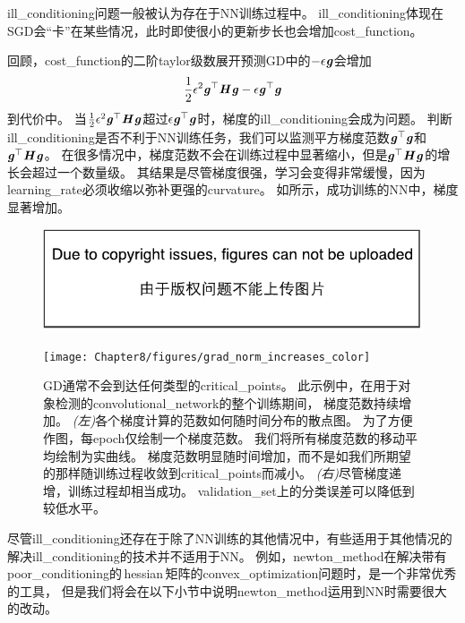 \gls{ill_conditioning}问题一般被认为存在于\gls{NN}训练过程中。
\gls{ill_conditioning}体现在\gls{SGD}会``卡''在某些情况，此时即使很小的更新步长也会增加\gls{cost_function}。

回顾，\gls{cost_function}的二阶\gls{taylor}级数展开预测\gls{GD}中的$-\epsilon\boldsymbol{\mathit{g}}$会增加
\begin{equation}
    \frac{1}{2} \epsilon^2 \boldsymbol{\mathit{g}}^\top \boldsymbol{\mathit{H}}\boldsymbol{\mathit{g}} - \epsilon\boldsymbol{\mathit{g}}^\top\boldsymbol{\mathit{g}}
\end{equation}
到代价中。
当$\frac{1}{2} \epsilon^2 \boldsymbol{\mathit{g}}^\top\boldsymbol{\mathit{H}}\boldsymbol{\mathit{g}}$超过$\epsilon\boldsymbol{\mathit{g}}^\top\boldsymbol{\mathit{g}}$时，梯度的\gls{ill_conditioning}会成为问题。
判断\gls{ill_conditioning}是否不利于\gls{NN}训练任务，我们可以监测平方梯度范数$\boldsymbol{\mathit{g}}^\top\boldsymbol{\mathit{g}}$和$\boldsymbol{\mathit{g}}^\top \boldsymbol{\mathit{H}}\boldsymbol{\mathit{g}}$。
在很多情况中，梯度范数不会在训练过程中显著缩小，但是$\boldsymbol{\mathit{g}}^\top\boldsymbol{\mathit{H}}\boldsymbol{\mathit{g}}$的增长会超过一个数量级。
其结果是尽管梯度很强，学习会变得非常缓慢，因为\gls{learning_rate}必须收缩以弥补更强的\gls{curvature}。
如所示，成功训练的\gls{NN}中，梯度显著增加。

\begin{figure}[!htb]
\ifOpenSource
\centerline{\includegraphics{figure.pdf}}
\else
\centerline{\texttt{[image: Chapter8/figures/grad\_norm\_increases\_color]}}
\fi
\caption{\gls{GD}通常不会到达任何类型的\gls{critical_points}。
此示例中，在用于对象检测的\gls{convolutional_network}的整个训练期间， 梯度范数持续增加。
\emph{(左)}各个梯度计算的范数如何随时间分布的散点图。
为了方便作图，每\gls{epoch}仅绘制一个梯度范数。 
我们将所有梯度范数的移动平均绘制为实曲线。
梯度范数明显随时间增加，而不是如我们所期望的那样随训练过程收敛到\gls{critical_points}而减小。
\emph{(右)}尽管梯度递增，训练过程却相当成功。 
\gls{validation_set}上的分类误差可以降低到较低水平。
}
\label{fig:chap8_grad_norm_increases}
\end{figure}


尽管\gls{ill_conditioning}还存在于除了\gls{NN}训练的其他情况中，有些适用于其他情况的解决\gls{ill_conditioning}的技术并不适用于\gls{NN}。
例如，\gls{newton_method}在解决带有\gls{poor_conditioning}的\,\gls{hessian}\,矩阵的\gls{convex_optimization}问题时，是一个非常优秀的工具，
但是我们将会在以下小节中说明\gls{newton_method}运用到\gls{NN}时需要很大的改动。


